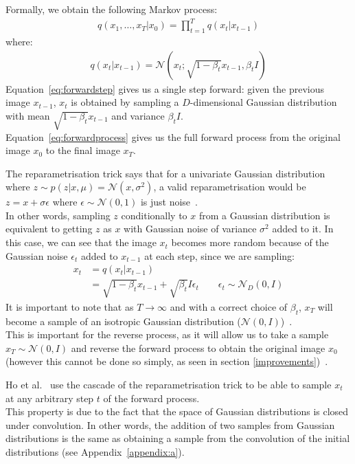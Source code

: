 \documentclass{article}
\numberwithin{equation}{section}
\numberwithin{figure}{section}
\begin{document}
Formally, we obtain the following Markov process:
\begin{align}
  q\left(x_{1},\dots, x_{T} | x_0\right) = \prod_{t = 1}^T{q\left(x_t | x_{t - 1}\right)} \label{eq:forwardprocess}
\end{align}
where:
\begin{align}
  q\left(x_t | x_{t-1}\right) = \mathcal{N}\left(x_t; \sqrt{1 - \beta_t}x_{t-1}, \beta_t I\right) \label{eq:forwardstep}
\end{align}
Equation~\ref{eq:forwardstep} gives us a single step forward: given the previous image $x_{t-1}$, $x_t$ is obtained by sampling a $D$-dimensional Gaussian distribution with mean $\sqrt{1 - \beta_t}x_{t-1}$ and variance $\beta_t I$. \\
Equation~\ref{eq:forwardprocess} gives us the full forward process from the original image $x_0$ to the final image $x_T$.

The reparametrisation trick says that for a univariate Gaussian distribution where $z \sim p\left(z | x, \mu \right) = \mathcal{N}\left(x, \sigma^2\right)$, a valid reparametrisation would be $z = x + \sigma \epsilon$ where $\epsilon \sim \mathcal{N}\left(0, 1\right)$ is just noise~\cite{kingma2022autoencoding}. \\
In other words, sampling $z$ conditionally to $x$ from a Gaussian distribution is equivalent to getting $z$ as $x$ with Gaussian noise of variance $\sigma^2$ added to it.
In this case, we can see that the image $x_t$ becomes more random because of the Gaussian noise $\epsilon_t$ added to $x_{t-1}$ at each step, since we are sampling:
\begin{align}
  x_t &= q(x_t | x_{t-1}) \\
  &= \sqrt{1 - \beta_t} x_{t-1} + \sqrt{\beta_t}I \epsilon_t \qquad \epsilon_t \sim \mathcal{N}_D \left(0, I\right)
\end{align}
\hypertarget{isotropic}{It is important to note that as $T \rightarrow \infty$ and with a correct choice of $\beta_t$, $x_T$ will become a sample of an isotropic Gaussian distribution ($\mathcal{N}\left(0, I\right)$)}~\cite{nichol2021improved, sohldickstein2015deep}. \\
This is important for the reverse process, as it will allow us to take a sample $x_T \sim \mathcal{N}\left(0, I\right)$ and reverse the forward process to obtain the original image $x_0$ (however this cannot be done so simply, as seen in section \ref{improvements})~\cite{nichol2021improved}.

Ho et al.~\cite{ho2020denoising} use the cascade of the reparametrisation trick to be able to sample $x_t$ at any arbitrary step $t$ of the forward process. \\
This property is due to the fact that the space of Gaussian distributions is closed under convolution. In other words, the addition of two samples from Gaussian distributions is the same as obtaining a sample from the convolution of the initial distributions (see Appendix~\ref{appendix:a}).
\end{document}
